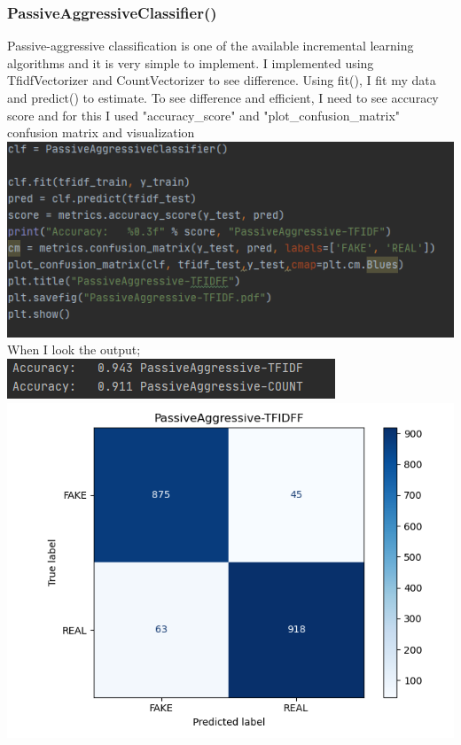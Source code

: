 \documentclass[onecolumn]{article}
\begin{document}
\subsubsection{PassiveAggressiveClassifier()}
Passive-aggressive classification is one of the available incremental learning algorithms and it is very simple to implement. I implemented using TfidfVectorizer and CountVectorizer to see difference. Using fit(), I fit my data and predict() to estimate. To see difference and efficient, I need to see accuracy score and for this I used "accuracy\_score" and "plot\_confusion\_matrix" confusion matrix and visualization\newline
\includegraphics[scale=0.7]{fig/10.PNG}\bigskip\newline
\noindent
When I look the output;\newline
\includegraphics[scale=0.7]{fig/13.PNG}\newline
\includegraphics[scale=0.3]{fig/16.PNG}
\end{document}
